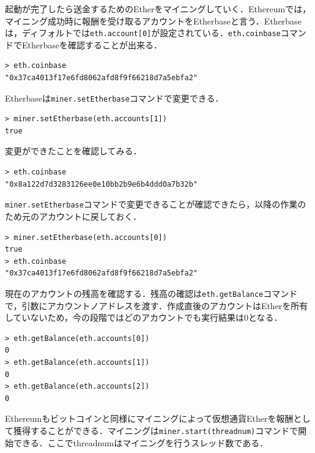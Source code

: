 起動が完了したら送金するためのEtherをマイニングしていく．Ethereumでは，マイニング成功時に報酬を受け取るアカウントをEtherbaseと言う．Etherbaseは，ディフォルトでは\texttt{eth.account[0]}が設定されている．\texttt{eth.coinbase}コマンドでEtherbaseを確認することが出来る．
\begin{verbatim}
> eth.coinbase
"0x37ca4013f17e6fd8062afd8f9f66218d7a5ebfa2"
\end{verbatim}
Etherbaseは\texttt{miner.setEtherbase}コマンドで変更できる．
\begin{verbatim}
> miner.setEtherbase(eth.accounts[1])
true
\end{verbatim}
変更ができたことを確認してみる．
\begin{verbatim}
> eth.coinbase
"0x8a122d7d3283126ee0e10bb2b9e6b4ddd0a7b32b"
\end{verbatim}
\texttt{miner.setEtherbase}コマンドで変更できることが確認できたら，以降の作業のため元のアカウントに戻しておく．
\begin{verbatim}
> miner.setEtherbase(eth.accounts[0])
true
> eth.coinbase
"0x37ca4013f17e6fd8062afd8f9f66218d7a5ebfa2"
\end{verbatim}
\newpage
現在のアカウントの残高を確認する．残高の確認は\texttt{eth.getBalance}コマンドで，引数にアカウントノアドレスを渡す．作成直後のアカウントはEtherを所有していないため，今の段階ではどのアカウントでも実行結果は0となる．
\begin{verbatim}
> eth.getBalance(eth.accounts[0])
0
> eth.getBalance(eth.accounts[1])
0
> eth.getBalance(eth.accounts[2])
0
\end{verbatim}

Ethereumもビットコインと同様にマイニングによって仮想通貨Etherを報酬として獲得することができる．マイニングは\texttt{miner.start(threadnum)}コマンドで開始できる．ここでthreadnumはマイニングを行うスレッド数である．

